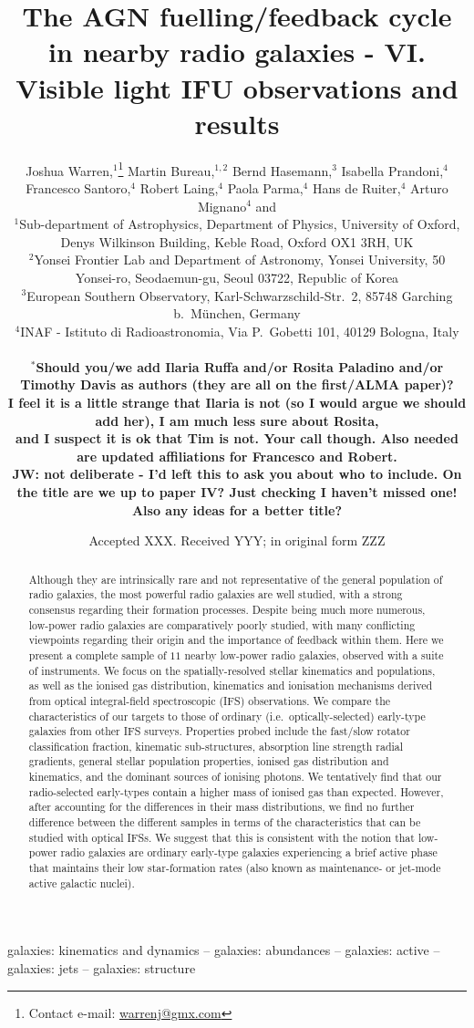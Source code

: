 \documentclass[a4paper,fleqn,usenatbib]{mnras}
\title[IFS Study of Low-power Radio Galaxies]{The AGN fuelling/feedback cycle in 
nearby radio galaxies - VI. Visible light IFU observations and results}
\author[J. Warren et al.]{
  Joshua Warren,$^{1}$\thanks{Contact e-mail:
    \href{mailto:warrenj@gmx.com}{warrenj@gmx.com}}
  Martin Bureau,$^{1,2}$ Bernd Hasemann,$^{3}$ \added{Ilaria Ruffa,$^{4}$} Isabella
  Prandoni,$^{4}$ \newauthor Francesco Santoro,$^{4}$ Robert
  Laing,$^{4}$ Paola Parma,$^{4}$ \added{Rosita Paladino,$^{4}$} Hans de Ruiter,$^{4}$ \newauthor
  Arturo Mignano$^{4}$ and \added{Timothy Davis$^{5}$}
  \\
  $^{1}$Sub-department of Astrophysics, Department of Physics,
  University of Oxford, Denys Wilkinson Building, Keble Road, Oxford
  OX1 3RH, UK\\
  $^{2}$Yonsei Frontier Lab and Department of Astronomy, Yonsei
  University, 50 Yonsei-ro, Seodaemun-gu, Seoul 03722, Republic of
  Korea\\
  $^{3}$European Southern Observatory, Karl-Schwarzschild-Str.\ 2,
  85748 Garching b.\ M{\"u}nchen, Germany\\
  $^{4}$INAF - Istituto di Radioastronomia, Via P.\ Gobetti 101, 40129
  Bologna, Italy\\
  \added{$^{5}$School of Physics \& Astronomy, Cardiff University, Queens Buildings, The Parade, Cardiff CF24 3AA, UK}\\
  $^*${\bf Should you/we add Ilaria Ruffa and/or Rosita Paladino
    and/or Timothy Davis as authors (they are all on the first/ALMA
    paper)?}\\{\bf I feel it is a little strange that Ilaria is not (so I
    would argue we should add her), I am much less sure about
    Rosita,}\\ {\bf and I suspect it is ok that Tim is not. Your call
    though. Also needed are updated affiliations for Francesco and
    Robert.}\\ {\bf JW: not deliberate - I'd left this to ask you about who to include.
    On the title are we up to paper IV? Just checking I haven't missed one!}\\ {\bf Also any ideas for a better title?}}
\date{Accepted XXX. Received YYY; in original form ZZZ}
\begin{document}
\label{firstpage}
\pagerange{\pageref{firstpage}--\pageref{lastpage}}
\maketitle

\begin{abstract}
  Although they are intrinsically rare and not representative of the
  general population of radio galaxies, the most powerful radio
  galaxies are well studied, with a strong consensus regarding their
  formation processes. Despite being much more numerous, low-power
  radio galaxies are comparatively poorly studied, with many
  conflicting viewpoints regarding their origin and the importance of
  feedback within them. Here we present a complete sample of $11$
  nearby low-power radio galaxies, observed with a suite of
  instruments. We focus on the spatially-resolved stellar kinematics
  and populations, as well as the ionised gas distribution, kinematics
  and ionisation mechanisms derived from optical integral-field
  spectroscopic (IFS) observations.
  We compare the characteristics of our targets to those of ordinary
  (i.e.\ optically-selected) early-type galaxies from other IFS
  surveys.
  Properties probed include the fast/slow rotator classification
  fraction, kinematic sub-structures, absorption line strength radial
  gradients, general stellar population properties, ionised gas
  distribution and kinematics, and the dominant sources of ionising
  photons. We tentatively find that our radio-selected early-types
  contain a higher mass of ionised gas than expected. However, after
  accounting for the differences in their mass distributions, we find
  no further difference between the different samples in terms of the
  characteristics that can be studied with optical IFSs. We suggest
  that this is consistent with the notion that low-power radio
  galaxies are ordinary early-type galaxies experiencing a brief
  active phase that maintains their low star-formation rates (also
  known as maintenance- or jet-mode active galactic nuclei).
\end{abstract}

\begin{keywords}
galaxies: kinematics and dynamics -- galaxies: abundances -- galaxies: active -- galaxies: jets -- galaxies: structure
\end{keywords}
\end{document}
